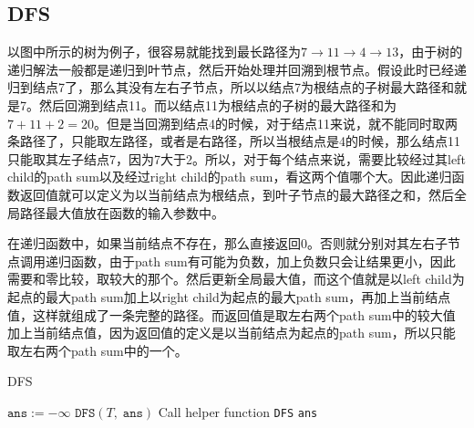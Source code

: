 \subsection{DFS}
\begin{figure}[H]
\end{figure}
\begin{CJK*}{UTF8}{gbsn}
以图中所示的树为例子，很容易就能找到最长路径为$7\to11\to4\to13$，由于树的递归解法一般都是递归到叶节点，然后开始处理并回溯到根节点。假设此时已经递归到结点7了，那么其没有左右子节点，所以以结点7为根结点的子树最大路径和就是7。然后回溯到结点11。而以结点11为根结点的子树的最大路径和为$7+11+2=20$。但是当回溯到结点4的时候，对于结点11来说，就不能同时取两条路径了，只能取左路径，或者是右路径，所以当根结点是4的时候，那么结点11只能取其左子结点7，因为7大于2。所以，对于每个结点来说，需要比较经过其left child的path sum以及经过right child的path sum，看这两个值哪个大。因此递归函数返回值就可以定义为以当前结点为根结点，到叶子节点的最大路径之和，然后全局路径最大值放在函数的输入参数中。
\end{CJK*}
\par
\begin{CJK*}{UTF8}{gbsn}
在递归函数中，如果当前结点不存在，那么直接返回0。否则就分别对其左右子节点调用递归函数，由于path sum有可能为负数，加上负数只会让结果更小，因此需要和零比较，取较大的那个。然后更新全局最大值，而这个值就是以left child为起点的最大path sum加上以right child为起点的最大path sum，再加上当前结点值，这样就组成了一条完整的路径。而返回值是取左右两个path sum中的较大值加上当前结点值，因为返回值的定义是以当前结点为起点的path sum，所以只能取左右两个path sum中的一个。
\end{CJK*}
\setcounter{algorithm}{0}
\begin{algorithm}[H]
\caption{DFS}
\begin{algorithmic}[1]
\State $\texttt{ans}:=-\infty$
\State $\texttt{DFS}(T,\;\texttt{ans})$ \Comment Call helper function \texttt{DFS}
\State \Return \texttt{ans}
\EndProcedure
\end{algorithmic}
\end{algorithm}
